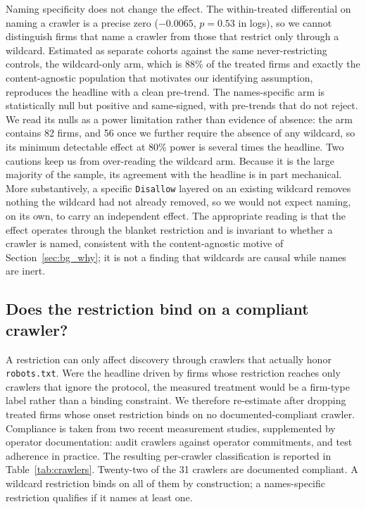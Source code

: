 \documentclass[12pt]{article}
\begin{document}
Naming specificity does not change the effect. The within-treated differential on naming a crawler is a precise zero ($-0.0065$, $p=0.53$ in logs), so we cannot distinguish firms that name a crawler from those that restrict only through a wildcard. Estimated as separate cohorts against the same never-restricting controls, the wildcard-only arm, which is 88\% of the treated firms and exactly the content-agnostic population that motivates our identifying assumption, reproduces the headline with a clean pre-trend. The names-specific arm is statistically null but positive and same-signed, with pre-trends that do not reject. We read its nulls as a power limitation rather than evidence of absence: the arm contains 82 firms, and 56 once we further require the absence of any wildcard, so its minimum detectable effect at 80\% power is several times the headline. Two cautions keep us from over-reading the wildcard arm. Because it is the large majority of the sample, its agreement with the headline is in part mechanical. More substantively, a specific \texttt{Disallow} layered on an existing wildcard removes nothing the wildcard had not already removed, so we would not expect naming, on its own, to carry an independent effect. The appropriate reading is that the effect operates through the blanket restriction and is invariant to whether a crawler is named, consistent with the content-agnostic motive of Section~\ref{sec:bg_why}; it is not a finding that wildcards are causal while names are inert.



\subsection{Does the restriction bind on a compliant crawler?}\label{app:compliant}
A restriction can only affect discovery through crawlers that actually honor \texttt{robots.txt}. Were the headline driven by firms whose restriction reaches only crawlers that ignore the protocol, the measured treatment would be a firm-type label rather than a binding constraint. We therefore re-estimate after dropping treated firms whose onset restriction binds on no documented-compliant crawler. Compliance is taken from two recent measurement studies, supplemented by operator documentation: \citet{CuiEtAl2025} audit crawlers against operator commitments, and \citet{LiuEtAl2025} test adherence in practice. The resulting per-crawler classification is reported in Table~\ref{tab:crawlers}. Twenty-two of the 31 crawlers are documented compliant. A wildcard restriction binds on all of them by construction; a names-specific restriction qualifies if it names at least one.
\end{document}
